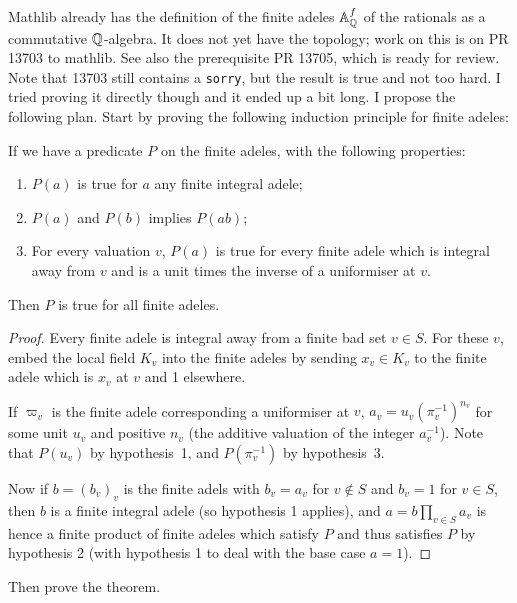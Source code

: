 Mathlib already has the definition of the finite adeles $\mathbb{A}_{\mathbb{Q}}^f$ of the rationals as a
commutative $\mathbb{Q}$-algebra. It does not yet have the topology; work on this is on PR 13703 to mathlib.
See also the prerequisite PR 13705, which is ready for review. Note that 13703 still contains a
{\tt sorry}, but the result is true and not too hard. I tried proving it directly though and it ended
up a bit long. I propose the following plan. Start by proving the following induction principle for
finite adeles:
\begin{lemma}
    \label{DedekindDomain.FiniteAdeleRing.mul_induction_on}
    \leanok
    If we have a predicate $P$ on the finite adeles, with the following properties:
  \begin{enumerate}
    \item $P(a)$ is true for $a$ any finite integral adele;
    \item $P(a)$ and $P(b)$ implies $P(ab)$;
    \item For every valuation $v$, $P(a)$ is true for every finite adele which is integral
      away from $v$ and is a unit times the inverse of a uniformiser at $v$.
  \end{enumerate}
  Then $P$ is true for all finite adeles.
\end{lemma}
\begin{proof}
  Every finite adele is integral away from a finite bad set $v\in S$. For these $v$,
  embed the local field $K_v$ into the finite adeles by sending $x_v\in K_v$ to the
  finite adele which is $x_v$ at $v$ and 1 elsewhere.

  If $\varpi_v$ is the finite adele corresponding a uniformiser at $v$,
  $a_v=u_v(\pi_v^{-1})^{n_v}$ for some unit $u_v$ and positive $n_v$ (the additive valuation
  of the integer $a_v^{-1}$). Note that $P(u_v)$ by hypothesis~1, and
  $P(\pi_v^{-1})$ by hypothesis~3.

  Now if $b=(b_v)_v$ is the finite adels with $b_v=a_v$ for $v\not\in S$ and $b_v=1$ for $v\in S$,
  then $b$ is a finite integral adele (so hypothesis 1 applies), and $a=b\prod_{v\in S}a_v$ is hence
  a finite product of finite adeles which satisfy $P$ and thus satisfies $P$ by hypothesis 2
  (with hypothesis 1 to deal with the base case $a=1$).
\end{proof}

Then prove the theorem.

